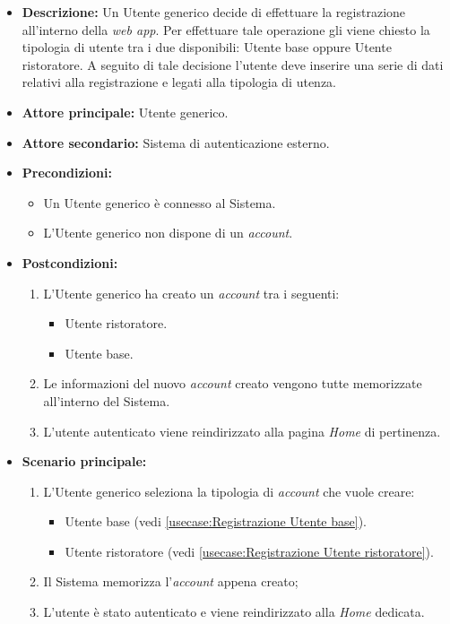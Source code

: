 \label{usecase:Effettua registrazione}

\begin{itemize}
	\item \textbf{Descrizione:} Un Utente generico decide di effettuare la registrazione all'interno della \textit{web app}. Per effettuare tale
	operazione gli viene chiesto la tipologia di utente tra i due disponibili: Utente base oppure Utente ristoratore. 
    A seguito di tale decisione l'utente deve inserire una serie di dati relativi alla registrazione e legati alla tipologia di utenza.

	\item \textbf{Attore principale:} Utente generico.
	\item \textbf{Attore secondario:} Sistema di autenticazione esterno.
	\item \textbf{Precondizioni:}
        \begin{itemize}
            \item Un Utente generico è connesso al Sistema.
            \item L'Utente generico non dispone di un \textit{account}.
        \end{itemize}
	\item \textbf{Postcondizioni:}
	    \begin{enumerate}
            \item L'Utente generico ha creato un \textit{account} tra i seguenti:
            \begin{itemize}
                \item Utente ristoratore.
                \item Utente base.
            \end{itemize}
            \item Le informazioni del nuovo \textit{account} creato vengono tutte memorizzate all'interno del Sistema.
            \item L'utente autenticato viene reindirizzato alla pagina \textit{Home} di pertinenza.
        \end{enumerate}


	\item \textbf{Scenario principale:}
	      \begin{enumerate}
		      \item L'Utente generico seleziona la tipologia di \textit{account} che vuole creare: 
		      \begin{itemize}
				\item Utente base (vedi \autoref{usecase:Registrazione Utente base}).
				\item Utente ristoratore (vedi \autoref{usecase:Registrazione Utente ristoratore}).
			  \end{itemize} 
              \item Il Sistema memorizza l'\textit{account} appena creato;
		      \item L'utente è stato autenticato e viene reindirizzato alla \textit{Home} dedicata.
	      \end{enumerate}
		

\end{itemize}
